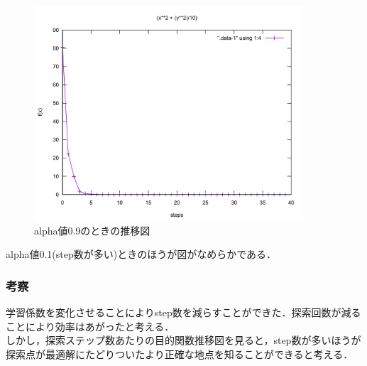 \begin{figure}[ht]
 \begin{center}
  \includegraphics[width=10.0cm]{figs/level2.2/sim-1.pdf}
  \caption{alpha値0.9のときの推移図}
	\label{step_alpha}
 \end{center}
\end{figure}

alpha値0.1(step数が多い)ときのほうが図がなめらかである．

\subsubsection{考察}

学習係数を変化させることによりstep数を減らすことができた．探索回数が減ることにより効率はあがったと考える．\\
しかし，探索ステップ数あたりの目的関数推移図を見ると，step数が多いほうが探索点が最適解にたどりついたより正確な地点を知ることができると考える．



